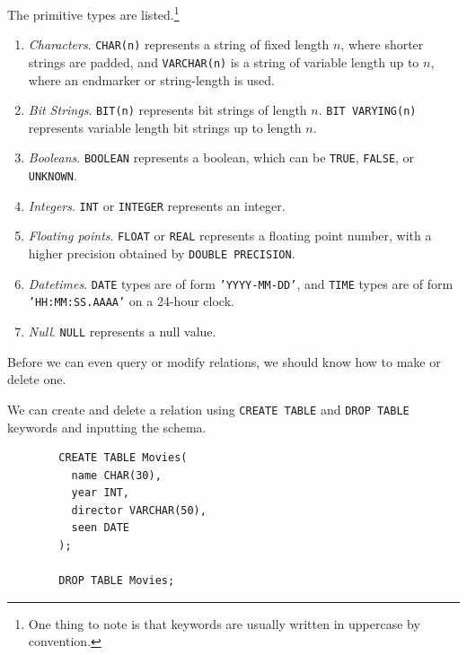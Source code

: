     \begin{definition}
      \label{def:primitive-types}
      The primitive types are listed.\footnote{One thing to note is that keywords are usually written in uppercase by convention.}
      \begin{enumerate}
        \item \textit{Characters}. \texttt{CHAR(n)} represents a string of fixed length $n$, where shorter strings are padded, and \texttt{VARCHAR(n)} is a string of variable length up to $n$, where an endmarker or string-length is used. 
        \item \textit{Bit Strings}. \texttt{BIT(n)} represents bit strings of length $n$. \texttt{BIT VARYING(n)} represents variable length bit strings up to length $n$. 
        \item \textit{Booleans}. \texttt{BOOLEAN} represents a boolean, which can be \texttt{TRUE}, \texttt{FALSE}, or \texttt{UNKNOWN}. 
        \item \textit{Integers}. \texttt{INT} or \texttt{INTEGER} represents an integer. 
        \item \textit{Floating points}. \texttt{FLOAT} or \texttt{REAL} represents a floating point number, with a higher precision obtained by \texttt{DOUBLE PRECISION}. 
        \item \textit{Datetimes}. \texttt{DATE} types are of form \texttt{'YYYY-MM-DD'}, and \texttt{TIME} types are of form \texttt{'HH:MM:SS.AAAA'} on a 24-hour clock. 
        \item \textit{Null}. \texttt{NULL} represents a null value. 
      \end{enumerate}
    \end{definition}
    
    Before we can even query or modify relations, we should know how to make or delete one. 

    \begin{theorem}
      \label{thm:create-table-drop-table}
      We can create and delete a relation using \texttt{CREATE TABLE} and \texttt{DROP TABLE} keywords and inputting the schema. 
      \begin{lstlisting}
        CREATE TABLE Movies(
          name CHAR(30), 
          year INT, 
          director VARCHAR(50), 
          seen DATE
        ); 

        DROP TABLE Movies; 
      \end{lstlisting}
    \end{theorem}

